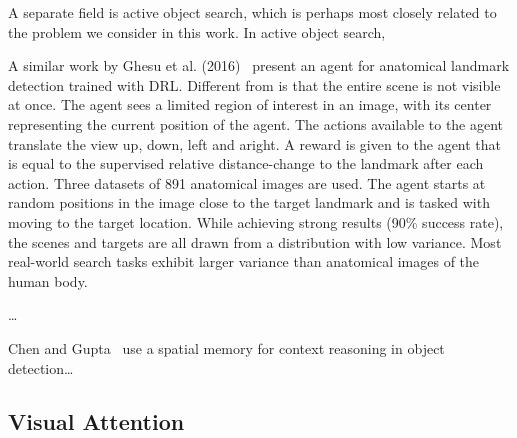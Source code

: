 A separate field is active object search, which is perhaps most closely related to the problem we consider in this work.
In active object search, %


% 

A similar work by Ghesu et al. (2016)~\cite{ghesu_artificial_2016} present an agent for anatomical landmark detection trained with DRL.
Different from \cite{caicedo_active_2015} is that the entire scene is not visible at once.
The agent sees a limited region of interest in an image, with its center representing the current position of the agent.
The actions available to the agent translate the view up, down, left and aright.
A reward is given to the agent that is equal to the supervised relative distance-change to the landmark after each action.
Three datasets of 891 anatomical images are used.
The agent starts at random positions in the image close to the target landmark and is tasked with moving to the target location.
While achieving strong results (90\% success rate), the scenes and targets are all drawn from a distribution with low variance.
Most real-world search tasks exhibit larger variance than anatomical images of the human body.

\cite{uzkent_detection_2020}\dots



Chen and Gupta~\cite{chen_memory_2017} use a spatial memory for context reasoning in object detection\dots

\subsection{Visual Attention}


